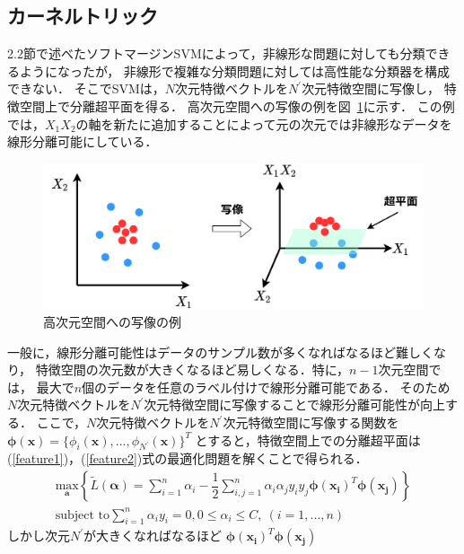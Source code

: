 \subsection{カーネルトリック}
2.2節で述べたソフトマージンSVMによって，非線形な問題に対しても分類できるようになったが， 
非線形で複雑な分類問題に対しては高性能な分類器を構成できない．    
そこでSVMは，$N$次元特徴ベクトルを$N^{\prime} $次元特徴空間に写像し，
特徴空間上で分離超平面を得る．
高次元空間への写像の例を図~\ref{syazou}に示す．
この例では，$X_1X_2$の軸を新たに追加することによって元の次元では非線形なデータを線形分離可能にしている．
\begin{figure}
    \centering
    \includegraphics[width=0.8\linewidth]{syazou.png}
    \caption{高次元空間への写像の例}
    \label{syazou}
\end{figure}
一般に，線形分離可能性はデータのサンプル数が多くなればなるほど難しくなり，
特徴空間の次元数が大きくなるほど易しくなる．特に，$n-1$次元空間では，
最大で$n$個のデータを任意のラベル付けで線形分離可能である．
そのため$N$次元特徴ベクトルを$N^{\prime} $次元特徴空間に写像することで線形分離可能性が向上する．
ここで，$N$次元特徴ベクトルを$N^{\prime} $次元特徴空間に写像する関数を
$\boldsymbol{\phi}(\boldsymbol{x}) = \{\phi_i(\boldsymbol{x}),...,\phi_{N^{\prime}}(\boldsymbol{x})\}^T$
とすると，特徴空間上での分離超平面は(\ref{feature1})，(\ref{feature2})式の最適化問題を解くことで得られる．
\begin{subequations}
\begin{align}  
    \underset{\boldsymbol{a}}{\text{max}} \left\{\tilde{L}(\boldsymbol{\alpha}) 
    = \sum_{i=1}^{n}\alpha_i - \dfrac{1}{2}\sum_{i,j=1}^{n}\label{feature1}
    \alpha_i\alpha_j y_i y_j \boldsymbol{\phi}(\boldsymbol{x_i})^T \boldsymbol{\phi}(\boldsymbol{x_j})\right\}  \\
    \text{subject to} \sum_{i=1}^{n}\alpha_i y_i = 0,0 \leq \alpha_i \leq C,\ (i=1,...,n)\label{feature2}
\end{align}
\end{subequations}
しかし次元$N^{\prime}$が大きくなればなるほど
$\boldsymbol{\phi}(\boldsymbol{x_i})^T \boldsymbol{\phi}(\boldsymbol{x_j})$

